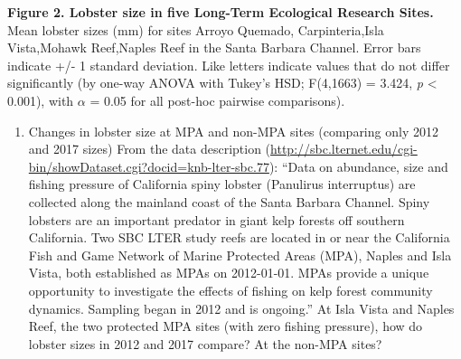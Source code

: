 \documentclass[]{article}
\newenvironment{Shaded}{\begin{snugshade}}{\end{snugshade}}
\newcommand{\KeywordTok}[1]{\textcolor[rgb]{0.13,0.29,0.53}{\textbf{{#1}}}}
\newcommand{\DecValTok}[1]{\textcolor[rgb]{0.00,0.00,0.81}{{#1}}}
\newcommand{\StringTok}[1]{\textcolor[rgb]{0.31,0.60,0.02}{{#1}}}
\newcommand{\NormalTok}[1]{{#1}}
\providecommand{\tightlist}{%
  \setlength{\itemsep}{0pt}\setlength{\parskip}{0pt}}
\begin{document}
\textbf{Figure 2. Lobster size in five Long-Term Ecological Research
Sites.} Mean lobster sizes (mm) for sites Arroyo Quemado,
Carpinteria,Isla Vista,Mohawk Reef,Naples Reef in the Santa Barbara
Channel. Error bars indicate +/- 1 standard deviation. Like letters
indicate values that do not differ significantly (by one-way ANOVA with
Tukey's HSD; F(4,1663) = 3.424, \emph{p} \textless{} 0.001), with
\(\alpha\) = 0.05 for all post-hoc pairwise comparisons).

\begin{enumerate}
\def\labelenumi{\arabic{enumi}.}
\setcounter{enumi}{2}
\tightlist
\item
  Changes in lobster size at MPA and non-MPA sites (comparing only 2012
  and 2017 sizes) From the data description
  (\url{http://sbc.lternet.edu/cgi-bin/showDataset.cgi?docid=knb-lter-sbc.77}):
  ``Data on abundance, size and fishing pressure of California spiny
  lobster (Panulirus interruptus) are collected along the mainland coast
  of the Santa Barbara Channel. Spiny lobsters are an important predator
  in giant kelp forests off southern California. Two SBC LTER study
  reefs are located in or near the California Fish and Game Network of
  Marine Protected Areas (MPA), Naples and Isla Vista, both established
  as MPAs on 2012-01-01. MPAs provide a unique opportunity to
  investigate the effects of fishing on kelp forest community dynamics.
  Sampling began in 2012 and is ongoing.'' At Isla Vista and Naples
  Reef, the two protected MPA sites (with zero fishing pressure), how do
  lobster sizes in 2012 and 2017 compare? At the non-MPA sites?
\end{enumerate}

\begin{Shaded}
\end{Shaded}
\end{document}
